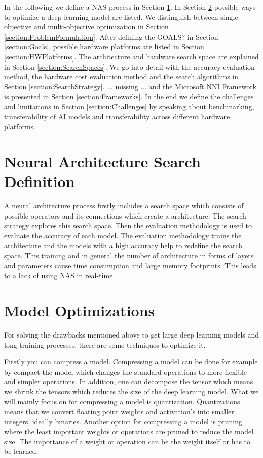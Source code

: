 \documentclass[conference]{IEEEtran}
\begin{document}
In the following we define a NAS process in Section \ref{section:NASDefinition}. In Section \ref{section:ModelOptimization} possible ways to optimize a deep learning model are listed. We distinguish between single-objective and multi-objective optimization in Section \ref{section:ProblemFormulation}. After defining the GOALS? in Section \ref{section:Goals}, possible hardware platforms are listed in Section \ref{section:HWPlatforms}.
The architecture and hardware search space are explained in Section \ref{section:SearchSpaces}. We go into detail with the accuracy evaluation method, the hardware cost evaluation method and the search algorithms in Section \ref{section:SearchStrategy}. ... missing ... and the Microsoft NNI Framework is presented in Section \ref{section:Frameworks}. In the end we define the challenges and limitations in Section \ref{section:Challenges} by speaking about benchmarking, transferability of AI models and transferability across different hardware platforms.  

\section{Neural Architecture Search Definition}
\label{section:NASDefinition}
A neural architecture process firstly includes a search space which consists of possible operators and its connections which create a architecture. The search strategy explores this search space. Then the evaluation methodology is used to evaluate the accuracy of each model. The evaluation methodology trains the architecture and the models with a high accuracy help to redefine the search space. This training and in general the  number of architecture in forms of layers and parameters cause time consumption and large memory footprints. This leads to a lack of using NAS in real-time. 

\section{Model Optimizations}
\label{section:ModelOptimization}
For solving the drawbacks mentioned above  to get large deep learning models and long training processes, there are some techniques to optimize it.

Firstly you can compress a model. Compressing a model can be done for example by compact the model which changes the standard operations to more flexible and simpler operations. In addition, one can decompose the tensor which means we shrink the tensors which reduces the size of the deep learning model. What we will mainly focus on for compressing a model is quantization. Quantizations means that we convert floating point weights and activation's into smaller integers, ideally binaries. Another option for compressing a model is pruning where the least important weights or operations are pruned to reduce the model size. The importance of a weight or operation can be the weight itself or has to be learned. 
\end{document}
